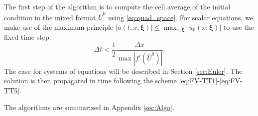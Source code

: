 \documentclass{article}
\newcommand{\bfxi}{ {\bm \xi} }
\begin{document}
The first step of the algorithm is to compute the cell average of the initial condition in the mixed format $\bar U^0$ using \eqref{eq:quad_space}. 
For scalar equations, we make use of the maximum principle $|u(t,x,\bfxi)| \leq \max_{x,\bfxi}|u_0(x,\bfxi)|$ to use the fixed time step
\begin{equation} \label{eq:CFL}
    \Delta t < \frac{1}{2} \frac{\Delta x}{\max|f'(\bar U^0)|}. 
\end{equation}
The case for systems of equations will be described in Section \ref{sec:Euler}.
The solution is then propagated in time following the scheme \eqref{eq:FV-TT1}-\eqref{eq:FV-TT5}.



The algorithms are summarized in Appendix \ref{sec:Algo}.
\end{document}
